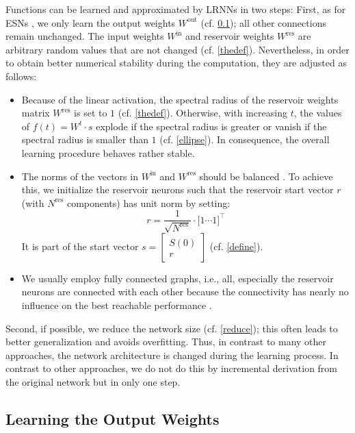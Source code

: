 \documentclass[twoside,11pt]{article}
\theoremstyle{definition}
\begin{document}
Functions can be learned and approximated by LRNNs in two steps: First, as for
ESNs \citep{JH04}, we only learn the output weights $W^\mathrm{out}$ (cf.
\cref{output}); all other connections remain unchanged. The input weights
$W^\mathrm{in}$ and reservoir weights $W^\mathrm{res}$ are arbitrary random
values that are not changed (cf. \cref{thedef}). Nevertheless, in order to
obtain better numerical stability during the computation, they are adjusted as
follows:
\begin{itemize}
  \item Because of the linear activation, the spectral radius of the reservoir
	weights matrix $W^\mathrm{res}$ is set to $1$ (cf. \cref{thedef}).
	Otherwise, with increasing $t$, the values of $f(t) = W^t \cdot s$
	explode if the spectral radius is greater or vanish if the spectral
	radius is smaller than $1$ (cf. \cref{ellipse}). In consequence, the
	overall learning procedure behaves rather stable.
  \item The norms of the vectors in $W^\mathrm{in}$ and $W^\mathrm{res}$ should
	be balanced \citep{KLB12}. To achieve this, we initialize the reservoir
	neurons such that the reservoir start vector $r$ (with $N^\mathrm{res}$
	components) has unit norm by
	setting:
	\[ r = \frac{1}{\sqrt{N^\mathrm{res}}} \cdot \big[ 1 \cdots 1 \big]^\top \]
	It is part of the start vector $s = \left[ \begin{array}{c} S(0) \\ r
	\end{array} \right]$ (cf. \cref{define}).
  \item We usually employ fully connected graphs, i.e., all, especially the
	reservoir neurons are connected with each other because the
	connectivity has nearly no influence on the best reachable performance
	\citep{KLB12}.
\end{itemize}
Second, if possible, we reduce the network size (cf. \cref{reduce});
this often leads to better generalization and avoids overfitting. Thus, in
contrast to many other approaches, the network architecture is changed during
the learning process. In contrast to other approaches, we do not do this by
incremental derivation from the original network but in only one step.

\subsection{Learning the Output Weights}\label{output}
\end{document}
